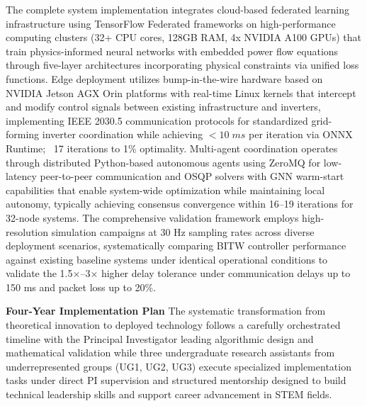\documentclass[12pt]{article}
\begin{document}
The complete system implementation integrates cloud-based federated learning infrastructure using TensorFlow Federated frameworks on high-performance computing clusters (32+ CPU cores, 128GB RAM, 4x NVIDIA A100 GPUs) that train physics-informed neural networks with embedded power flow equations through five-layer architectures incorporating physical constraints via unified loss functions. Edge deployment utilizes bump-in-the-wire hardware based on NVIDIA Jetson AGX Orin platforms with real-time Linux kernels that intercept and modify control signals between existing infrastructure and inverters, implementing IEEE 2030.5 communication protocols for standardized grid-forming inverter coordination while achieving $<10\;ms$ per iteration via ONNX Runtime; ~17 iterations to 1\% optimality. Multi-agent coordination operates through distributed Python-based autonomous agents using ZeroMQ for low-latency peer-to-peer communication and OSQP solvers with GNN warm-start capabilities that enable system-wide optimization while maintaining local autonomy, typically achieving consensus convergence within 16--19 iterations for 32-node systems. The comprehensive validation framework employs high-resolution simulation campaigns at 30 Hz sampling rates across diverse deployment scenarios, systematically comparing BITW controller performance against existing baseline systems under identical operational conditions to validate the 1.5×--3× higher delay tolerance under communication delays up to 150 ms and packet loss up to 20\%.

\textbf{Four-Year Implementation Plan} The systematic transformation from theoretical innovation to deployed technology follows a carefully orchestrated timeline with the Principal Investigator leading algorithmic design and mathematical validation while three undergraduate research assistants from underrepresented groups (UG1, UG2, UG3) execute specialized implementation tasks under direct PI supervision and structured mentorship designed to build technical leadership skills and support career advancement in STEM fields.
\end{document}
